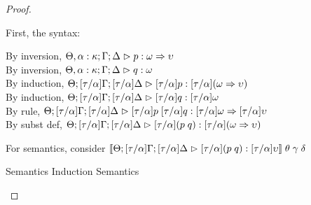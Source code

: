 \begin{proof}
\begin{enumerate}
  First, the syntax:
  \begin{tabbedproof}
    \oo By inversion, $\judgeA[\Theta, \alpha:\kappa; \Gamma; \Delta]{p}{\omega \To \upsilon}$\\
    \oo By inversion, $\judgeA[\Theta, \alpha:\kappa; \Gamma; \Delta]{q}{\omega}$\\
    \oo By induction, $\judgeA[\Theta; {[\tau/\alpha]}\Gamma; {[\tau/\alpha]}\Delta]{{[\tau/\alpha]}p}{{[\tau/\alpha]}(\omega \To \upsilon)}$\\
    \oo By induction, $\judgeA[\Theta; {[\tau/\alpha]}\Gamma; {[\tau/\alpha]}\Delta]{{[\tau/\alpha]}q}{{[\tau/\alpha]}\omega}$\\
    \oo By rule, $\judgeA[\Theta; {[\tau/\alpha]}\Gamma; {[\tau/\alpha]}\Delta]{{[\tau/\alpha]}p\;{[\tau/\alpha]}q}{{[\tau/\alpha]}\omega \To {[\tau/\alpha]}\upsilon}$\\
    \oo By subst def, $\judgeA[\Theta; {[\tau/\alpha]}\Gamma; {[\tau/\alpha]}\Delta]{{[\tau/\alpha]}(p\;q)}{{[\tau/\alpha]}(\omega \To \upsilon)}$\\
  \end{tabbedproof}

  For semantics, consider $\interp{\judgeA[\Theta; {[\tau/\alpha]}\Gamma; {[\tau/\alpha]}\Delta]{{[\tau/\alpha]}(p\;q)}{{[\tau/\alpha]}\upsilon}}\;\theta\;\gamma\;\delta$
  \begin{eqnproof}
    {Semantics}
    {Induction}
          {Semantics}
  \end{eqnproof}



\end{enumerate}
\end{proof}
